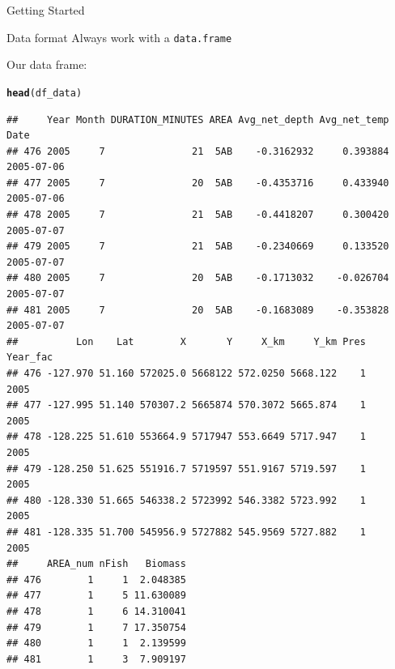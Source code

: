 \documentclass{beamer}\usepackage[]{graphicx}\usepackage[]{color}
\makeatletter
\newcommand{\hlstd}[1]{\textcolor[rgb]{0.345,0.345,0.345}{#1}}%
\newcommand{\hlkwd}[1]{\textcolor[rgb]{0.737,0.353,0.396}{\textbf{#1}}}%
\newenvironment{kframe}{%
 \def\at@end@of@kframe{}%
 \ifinner\ifhmode%
  \def\at@end@of@kframe{\end{minipage}}%
  \begin{minipage}{\columnwidth}%
 \fi\fi%
 \def\FrameCommand##1{\hskip\@totalleftmargin \hskip-\fboxsep
 \colorbox{shadecolor}{##1}\hskip-\fboxsep
     \hskip-\linewidth \hskip-\@totalleftmargin \hskip\columnwidth}%
 \MakeFramed {\advance\hsize-\width
   \@totalleftmargin\z@ \linewidth\hsize
   \@setminipage}}%
 {\par\unskip\endMakeFramed%
 \at@end@of@kframe}
\newenvironment{knitrout}{}{} %
\makeatother
\begin{document}
\begin{frame}[fragile]{Getting Started}

  \begin{alertblock}{Data format}
    Always work with a \texttt{data.frame}
  \end{alertblock}
    Our data frame:
    
\begin{knitrout}
\color{fgcolor}\begin{kframe}
\begin{alltt}
  \hlkwd{head}\hlstd{(df_data)}
\end{alltt}
\begin{verbatim}
##     Year Month DURATION_MINUTES AREA Avg_net_depth Avg_net_temp       Date
## 476 2005     7               21  5AB    -0.3162932     0.393884 2005-07-06
## 477 2005     7               20  5AB    -0.4353716     0.433940 2005-07-06
## 478 2005     7               21  5AB    -0.4418207     0.300420 2005-07-07
## 479 2005     7               21  5AB    -0.2340669     0.133520 2005-07-07
## 480 2005     7               20  5AB    -0.1713032    -0.026704 2005-07-07
## 481 2005     7               20  5AB    -0.1683089    -0.353828 2005-07-07
##          Lon    Lat        X       Y     X_km     Y_km Pres Year_fac
## 476 -127.970 51.160 572025.0 5668122 572.0250 5668.122    1     2005
## 477 -127.995 51.140 570307.2 5665874 570.3072 5665.874    1     2005
## 478 -128.225 51.610 553664.9 5717947 553.6649 5717.947    1     2005
## 479 -128.250 51.625 551916.7 5719597 551.9167 5719.597    1     2005
## 480 -128.330 51.665 546338.2 5723992 546.3382 5723.992    1     2005
## 481 -128.335 51.700 545956.9 5727882 545.9569 5727.882    1     2005
##     AREA_num nFish   Biomass
## 476        1     1  2.048385
## 477        1     5 11.630089
## 478        1     6 14.310041
## 479        1     7 17.350754
## 480        1     1  2.139599
## 481        1     3  7.909197
\end{verbatim}
\end{kframe}
\end{knitrout}
\end{frame}

\end{document}

